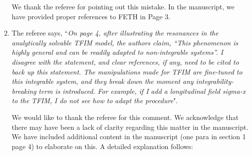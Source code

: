 \documentclass[aps,prb,reprint,showpacs,floatfix,superscriptaddress, onecolumn, nofootinbib, 9pt]{revtex4-2}
\newcommand{\response}[1]{{\color{black}#1}} %
\newcommand{\comment}[1]{{\color{blue}#1}} %
\begin{document}
\begin{enumerate}
\response{
	We thank the referee for pointing out this mistake. In the manuscript, we have provided proper references to FETH in Page 3.
}

\item The referee says, \comment{``\textit{On page 4, after illustrating the resonances in the analytically solvable TFIM model, the authors claim, “This phenomenon is highly general and can be readily adapted to non-integrable systems”. I disagree with the statement, and clear references, if any, need to be cited to back up this statement. The manipulations made for TFIM are fine-tuned to this integrable system, and they break down the moment any integrability-breaking term is introduced. For example, if I add a longitudinal field sigma-x to the TFIM, I do not see how to adapt the procedure}"}.\\

\response{ We would like to thank the referee for this comment. We acknowledge that there may have been a lack of clarity regarding this matter in the manuscript. We have included additional content in the manuscript (one para in section 1 page 4) to elaborate on this. A detailed explanation follows:
	
}
\end{enumerate}
\end{document}
